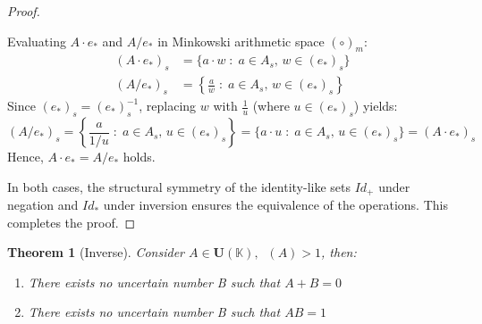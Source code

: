 \documentclass[a4paper,12pt, twoside]{memoir}
\newtheorem{theorem}{Theorem}[chapter]
\DeclareMathOperator{\dimU}{\dim_U}
\newcommand{\tsbd}[1]{\mathbf{U}(\mathbb{#1})}
\begin{document}
\begin{proof}
\begin{enumerate}[leftmargin=*]
		      Evaluating $A \cdot e_*$ and $A / e_*$ in Minkowski arithmetic space $(\circ)_m$:
		      \begin{align*}
			      (A \cdot e_*)_s & = \{a \cdot w \;:\; a \in A_s, \, w \in (e_*)_s\}                \\
			      (A / e_*)_s     & = \left\{ \frac{a}{w} \;:\; a \in A_s, \, w \in (e_*)_s \right\}
		      \end{align*}
		      Since $(e_*)_s = (e_*)_s^{-1}$, replacing $w$ with $\frac{1}{u}$ (where $u \in (e_*)_s$) yields:
		      \[
			      (A / e_*)_s = \left\{ \frac{a}{1/u} \;:\; a \in A_s, \, u \in (e_*)_s \right\} = \{a \cdot u \;:\; a \in A_s, \, u \in (e_*)_s\} = (A \cdot e_*)_s
		      \]
		      Hence, $A \cdot e_* = A / e_*$ holds.
	\end{enumerate}
	In both cases, the structural symmetry of the identity-like sets $Id_+$ under negation and $Id_*$ under inversion ensures the equivalence of the operations. This completes the proof.
\end{proof}
\begin{theorem}[Inverse]
	Consider $A \in \tsbd{K}, \dimU(A) > 1$, then:
	\begin{enumerate}[leftmargin=*]
		\item There exists no uncertain number B such that $A+B = 0$
		\item There exists no uncertain number B such that $AB = 1$
	\end{enumerate}
\end{theorem}
\end{document}
